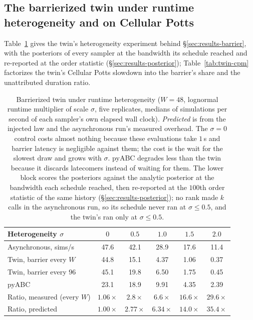 \documentclass[10pt]{article}
\theoremstyle{plain}
\theoremstyle{definition}
\begin{document}
\subsection{The barrierized twin under runtime heterogeneity and on Cellular Potts}
Table~\ref{tab:twin-hetero} gives the twin's heterogeneity experiment behind \S\ref{sec:results-barrier}, with the posteriors of every sampler at the bandwidth its schedule reached and re-reported at the order statistic (\S\ref{sec:results-posterior}); Table~\ref{tab:twin-cpm} factorizes the twin's Cellular Potts slowdown into the barrier's share and the unattributed duration ratio.
\begin{table}[h]
\caption{Barrierized twin under runtime heterogeneity ($W=48$, lognormal runtime multiplier of scale $\sigma$, five replicates, medians of simulations per second of each sampler's own elapsed wall clock). \emph{Predicted} is from the injected law and the asynchronous run's measured overhead. The $\sigma=0$ control costs almost nothing because these evaluations take $1$\,s and barrier latency is negligible against them; the cost is the wait for the slowest draw and grows with $\sigma$. pyABC degrades less than the twin because it discards latecomers instead of waiting for them. The lower block scores the posteriors against the analytic posterior at the bandwidth each schedule reached, then re-reported at the $100$th order statistic of the same history (\S\ref{sec:results-posterior}); no rank made $k$ calls in the asynchronous run, so its schedule never ran at $\sigma\le0.5$, and the twin's ran only at $\sigma\le0.5$.}\label{tab:twin-hetero}
\centering
\small
\setlength{\tabcolsep}{4pt}
\begin{tabular}{@{}lccccc@{}}
\toprule
Heterogeneity $\sigma$ & $0$ & $0.5$ & $1.0$ & $1.5$ & $2.0$ \\
\midrule
Asynchronous, sims/s              & 47.6 & 42.1 & 28.9 & 17.6 & 11.4 \\
Twin, barrier every $W$           & 44.8 & 15.1 & 4.37 & 1.06 & 0.37 \\
Twin, barrier every $96$          & 45.1 & 19.8 & 6.50 & 1.75 & 0.45 \\
pyABC                             & 23.1 & 18.9 & 9.91 & 4.35 & 2.39 \\
\midrule
Ratio, measured (every $W$)       & $1.06\times$ & $2.8\times$ & $6.6\times$ & $16.6\times$ & $29.6\times$ \\
Ratio, predicted                  & $1.00\times$ & $2.77\times$ & $6.34\times$ & $14.0\times$ & $35.4\times$ \\

\end{tabular}
\end{table}
\end{document}
